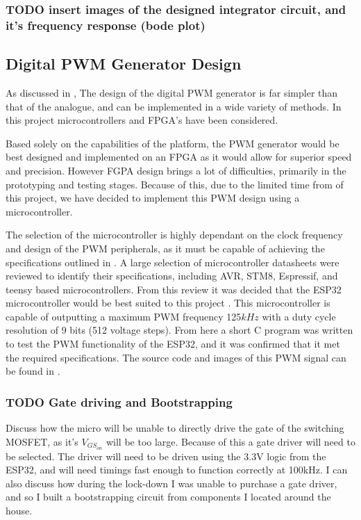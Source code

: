 \subsubsection{TODO insert images of the designed integrator circuit, and it's frequency response (bode plot)} 

\subsection{Digital PWM Generator Design}\label{S:digital_design}

As discussed in , The design of the digital PWM generator is far simpler than that of the analogue, and can be implemented in a wide variety of methods. In this project microcontrollers and FPGA's have been considered.

Based solely on the capabilities of the platform, the PWM generator would be best designed and implemented on an FPGA as it would allow for superior speed and precision. However FGPA design brings a lot of difficulties, primarily in the prototyping and testing stages. Because of this, due to the limited time from of this project, we have decided to implement this PWM design using a microcontroller.

The selection of the microcontroller is highly dependant on the clock frequency and design of the PWM peripherals, as it must be capable of achieving the specifications outlined in . A large selection of microcontroller datasheets were reviewed to identify their specifications, including AVR, STM8, Espressif, and teensy based microcontrollers. From this review it was decided that the ESP32 microcontroller would be best suited to this project \cite{ESP32Manual}. This microcontroller is capable of outputting a maximum PWM frequency 125$kHz$ with a duty cycle resolution of 9 bits (512 voltage steps). From here a short C program was written to test the PWM functionality of the ESP32, and it was confirmed that it met the required specifications. The source code and images of this PWM signal can be found in .

\subsubsection{TODO Gate driving and Bootstrapping} 

Discuss how the micro will be unable to directly drive the gate of the switching MOSFET, as it's $V_{GS_{on}}$ will be too large. Because of this a gate driver will need to be selected. The driver will need to be driven using the 3.3V logic from the ESP32, and will need timings fast enough to function correctly at 100kHz. I can also discuss how during the lock-down I was unable to purchase a gate driver, and so I built a bootstrapping circuit from components I located around the house. 
 





